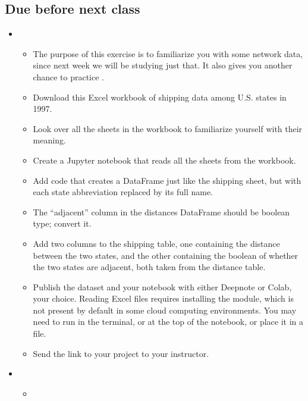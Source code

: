 \documentclass[letterpaper,10pt,english]{sphinxmanual}
\begin{document}
\subsection{Due before next class}
\label{\detokenize{course-schedule:id16}}\begin{itemize}
\item {} 
\begin{itemize}
\item {} 
The purpose of this exercise is to familiarize you with some network data, since next week we will be studying just that.  It also gives you another chance to practice .

\item {} 
Download this Excel workbook of shipping data among U.S. states in 1997.

\item {} 
Look over all the sheets in the workbook to familiarize yourself with their meaning.

\item {} 
Create a Jupyter notebook that reads all the sheets from the workbook.

\item {} 
Add code that creates a DataFrame just like the shipping sheet, but with each state abbreviation replaced by its full name.

\item {} 
The “adjacent” column in the distances DataFrame should be boolean type; convert it.

\item {} 
Add two columns to the shipping table, one containing the distance between the two states, and the other containing the boolean of whether the two states are adjacent, both taken from the distance table.

\item {} 
Publish the dataset and your notebook with either Deepnote or Colab, your choice.   Reading Excel files requires installing the  module, which is not present by default in some cloud computing environments.  You may need to run  in the terminal, or at the top of the notebook, or place it in a  file.

\item {} 
Send the link to your project to your instructor.

\end{itemize}

\item {} 
\begin{itemize}
\item {} 
{\hyperref[\detokenize{chapter-15-networks::doc}]{}}

\end{itemize}

\end{itemize}
\end{document}
